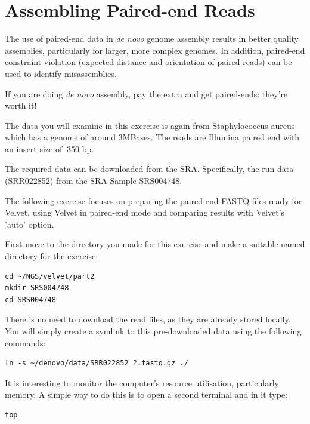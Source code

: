\section{Assembling Paired-end Reads}

The use of paired-end data in \textit{de novo} genome assembly results in better
quality assemblies, particularly for larger, more complex genomes. In addition,
paired-end constraint violation (expected distance and orientation of paired
reads) can be used to identify misassemblies.

\begin{warning}
If you are doing \textit{de novo} assembly, pay the extra and get paired-ends:
they're worth it!
\end{warning}

\begin{note}
The data you will examine in this exercise is again from Staphylococcus aureus
which has a genome of around 3MBases. The reads are Illumina paired end with an
insert size of $~$350 bp.

The required data can be downloaded from the SRA. Specifically, the run data
(SRR022852) from the SRA Sample SRS004748.


\end{note}

\begin{information}
The following exercise focuses on preparing the paired-end FASTQ files ready for
Velvet, using Velvet in paired-end mode and comparing results with Velvet's
'auto' option.
\end{information}

\begin{steps}
First move to the directory you made for this exercise and make a suitable named
directory for the exercise:
\begin{lstlisting}
cd ~/NGS/velvet/part2 
mkdir SRS004748 
cd SRS004748
\end{lstlisting}

There is no need to download the read files, as they are already stored
locally. You will simply create a symlink to this pre-downloaded data using
the following commands:
\begin{lstlisting}
ln -s ~/denovo/data/SRR022852_?.fastq.gz ./
\end{lstlisting}

It is interesting to monitor the computer's resource utilisation, particularly
memory. A simple way to do this is to open a second terminal and in it type:
\begin{lstlisting}
top
\end{lstlisting}
\end{steps}

